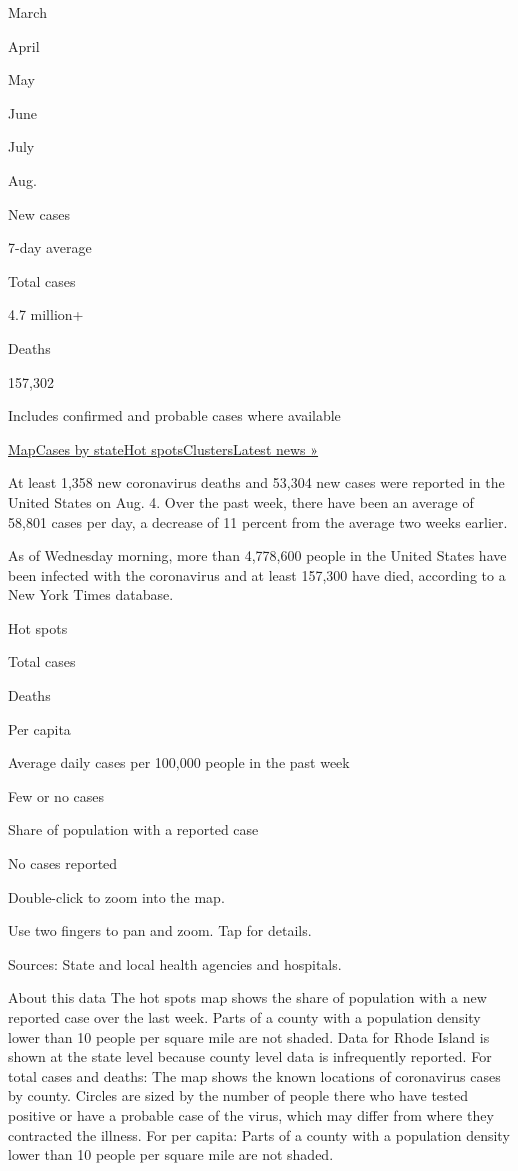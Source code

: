 March

April

May

June

July

Aug.

New cases

7-day average

Total cases

4.7 million+

Deaths

157,302

Includes confirmed and probable cases where available

\protect\hyperlink{map}{Map}\protect\hyperlink{states}{Cases by
state}\protect\hyperlink{hotspots}{Hot
spots}\protect\hyperlink{clusters}{Clusters}\href{https://www.nytimes3xbfgragh.onion/2020/08/04/world/coronavirus-covid-19.html}{Latest
news »}

At least 1,358 new coronavirus deaths and 53,304 new cases were reported
in the United States on Aug. 4. Over the past week, there have been an
average of 58,801 cases per day, a decrease of 11 percent from the
average two weeks earlier.

As of Wednesday morning, more than 4,778,600 people in the United States
have been infected with the coronavirus and at least 157,300 have died,
according to a New York Times database.

Hot spots

Total cases

Deaths

Per capita

Average daily cases per 100,000 people in the past week

Few or no cases

Share of population with a reported case

No cases reported

Double-click to zoom into the map.

Use two fingers to pan and zoom. Tap for details.

Sources: State and local health agencies and hospitals.

About this data The hot spots map shows the share of population with a
new reported case over the last week. Parts of a county with a
population density lower than 10 people per square mile are not shaded.
Data for Rhode Island is shown at the state level because county level
data is infrequently reported. For total cases and deaths: The map shows
the known locations of coronavirus cases by county. Circles are sized by
the number of people there who have tested positive or have a probable
case of the virus, which may differ from where they contracted the
illness. For per capita: Parts of a county with a population density
lower than 10 people per square mile are not shaded.

